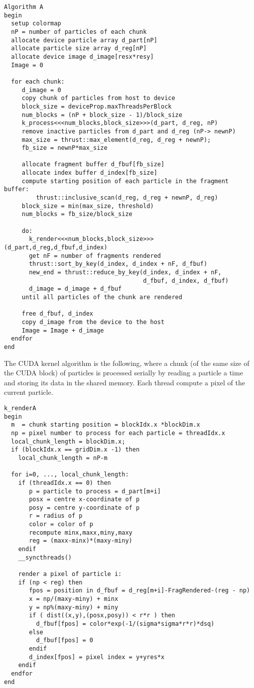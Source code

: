 \documentclass[11pt]{article}
\begin{document}
\small
\begin{verbatim}
Algorithm A
begin
  setup colormap
  nP = number of particles of each chunk
  allocate device particle array d_part[nP]
  allocate particle size array d_reg[nP]
  allocate device image d_image[resx*resy]
  Image = 0
 
  for each chunk: 
     d_image = 0
     copy chunk of particles from host to device  
     block_size = deviceProp.maxThreadsPerBlock
     num_blocks = (nP + block_size - 1)/block_size
     k_process<<<num_blocks,block_size>>>(d_part, d_reg, nP) 
     remove inactive particles from d_part and d_reg (nP-> newnP) 
     max_size = thrust::max_element(d_reg, d_reg + newnP);
     fb_size = newnP*max_size

     allocate fragment buffer d_fbuf[fb_size]
     allocate index buffer d_index[fb_size]
     compute starting position of each particle in the fragment buffer:  
         thrust::inclusive_scan(d_reg, d_reg + newnP, d_reg)         
     block_size = min(max_size, threshold)
     num_blocks = fb_size/block_size

     do:
       k_render<<<num_blocks,block_size>>>(d_part,d_reg,d_fbuf,d_index)  
       get nF = number of fragments rendered 
       thrust::sort_by_key(d_index, d_index + nF, d_fbuf)
       new_end = thrust::reduce_by_key(d_index, d_index + nF, 
                                       d_fbuf, d_index, d_fbuf) 
       d_image = d_image + d_fbuf
     until all particles of the chunk are rendered
     
     free d_fbuf, d_index
     copy d_image from the device to the host
     Image = Image + d_image
  endfor
end
\end{verbatim}
\normalsize
The CUDA kernel algorithm is the following, where a chunk (of the same size of the CUDA block) of particles is processed serially by reading a particle a time and storing its data in the shared memory. Each thread compute a pixel of the current particle. 
\small
\begin{verbatim}
k_renderA
begin
  m  = chunk starting position = blockIdx.x *blockDim.x
  np = pixel number to process for each particle = threadIdx.x
  local_chunk_length = blockDim.x;
  if (blockIdx.x == gridDim.x -1) then
    local_chunk_length = nP-m

  for i=0, ..., local_chunk_length:
    if (threadIdx.x == 0) then
       p = particle to process = d_part[m+i]
       posx = centre x-coordinate of p
       posy = centre y-coordinate of p
       r = radius of p
       color = color of p
       recompute minx,maxx,miny,maxy
       reg = (maxx-minx)*(maxy-miny)
    endif
    __syncthreads()

    render a pixel of particle i:
    if (np < reg) then
       fpos = position in d_fbuf = d_reg[m+i]-FragRendered-(reg - np)
       x = np/(maxy-miny) + minx
       y = np%(maxy-miny) + miny
       if ( dist((x,y),(posx,posy)) < r*r ) then
         d_fbuf[fpos] = color*exp(-1/(sigma*sigma*r*r)*dsq)
       else 
         d_fbuf[fpos] = 0
       endif
       d_index[fpos] = pixel index = y+yres*x
    endif
  endfor
end
\end{verbatim}
\end{document}
